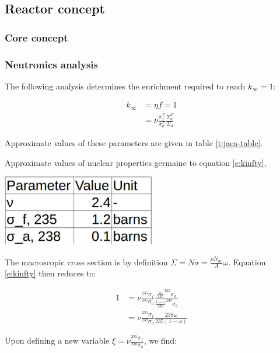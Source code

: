 \documentclass[12pt]{article}
\begin{document}
\subsection{Reactor concept}
\subsubsection{Core concept}
\subsubsection{Neutronics analysis}
The following analysis determines the enrichment required to reach $k_\infty = 1$:

\begin{align}
k_\infty &= \eta f = 1 \\
 &= \nu \frac{\sigma_f^F}{\sigma_a^F} \frac{\Sigma_a^F}{\Sigma_a} \label{e:kinfty}
\end{align}

Approximate values of these parameters are given in table \ref{t:jaea-table}.

\begin{table}[H]
\begin{center}
  \caption{Approximate values of nuclear properties germaine to equation \ref{e:kinfty}, \cite{jaea}}
  \label{t:jaea-table}
  \includegraphics[width=0.5\textwidth]{full-spectrum-nuke-data}
\end{center}
\end{table}


The macroscopic cross section is by definition $\Sigma = N \sigma = \frac{\rho N_{av}}{A} \omega$. Equation \ref{e:kinfty} then reduces to:

\begin{align}
1 &= \nu \frac{^{235}\sigma_f}{^{235}\sigma_a} \frac{\frac{\omega}{235} ^{235} \sigma_a}{\frac{1 - \omega}{238} ^{238} \sigma_a} \\
 &= \nu \frac{^{235} \sigma_f}{^{238} \sigma_a} \frac{238 \omega}{235 (1 - \omega)} 
\end{align}

Upon defining a new variable $\xi = \nu \frac{^{235} \sigma_f}{^{238} \sigma_a}$, we find:
\end{document}

